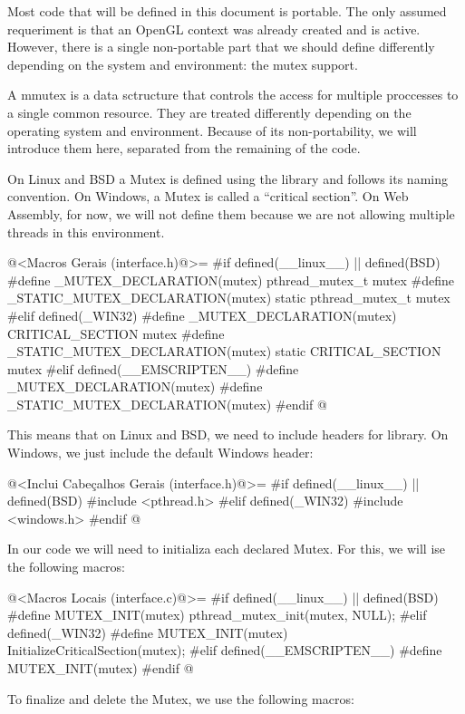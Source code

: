 
Most code that will be defined in this document is portable. The only
assumed requeriment is that an OpenGL context was already created and
is active. However, there is a single non-portable part that we should
define differently depending on the system and environment: the mutex
support.

A mmutex is a data sctructure that controls the access for multiple
proccesses to a single common resource. They are treated differently
depending on the operating system and environment. Because of its
non-portability, we will introduce them here, separated from the
remaining of the code.

On Linux and BSD a Mutex is defined using the library
 and follows its naming convention. On Windows, a
Mutex is called a ``critical section''. On Web Assembly, for now, we
will not define them because we are not allowing multiple threads in
this environment.

\iniciocodigo
@<Macros Gerais (interface.h)@>=
#if defined(__linux__) || defined(BSD)
#define _MUTEX_DECLARATION(mutex) pthread_mutex_t mutex
#define _STATIC_MUTEX_DECLARATION(mutex) static pthread_mutex_t mutex
#elif defined(_WIN32)
#define _MUTEX_DECLARATION(mutex) CRITICAL_SECTION mutex
#define _STATIC_MUTEX_DECLARATION(mutex) static CRITICAL_SECTION mutex
#elif defined(__EMSCRIPTEN__)
#define _MUTEX_DECLARATION(mutex)
#define _STATIC_MUTEX_DECLARATION(mutex)
#endif
@
\fimcodigo

This means that on Linux and BSD, we need to include headers for
 library. On Windows, we just include the default
Windows header:

\iniciocodigo
@<Inclui Cabeçalhos Gerais (interface.h)@>=
#if defined(__linux__) || defined(BSD)
#include <pthread.h>
#elif defined(_WIN32)
#include <windows.h>
#endif
@
\fimcodigo

In our code we will need to initializa each declared Mutex. For this,
we will ise the following macros:

\iniciocodigo
@<Macros Locais (interface.c)@>=
#if defined(__linux__) || defined(BSD)
#define MUTEX_INIT(mutex) pthread_mutex_init(mutex, NULL);
#elif defined(_WIN32)
#define MUTEX_INIT(mutex) InitializeCriticalSection(mutex);
#elif defined(__EMSCRIPTEN__)
#define MUTEX_INIT(mutex)
#endif
@
\fimcodigo

To finalize and delete the Mutex, we use the following macros:

